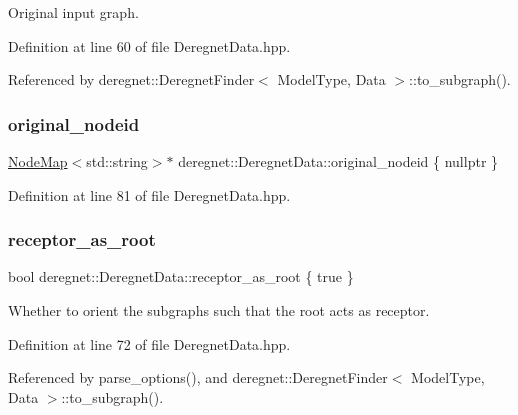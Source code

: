 Original input graph. 



Definition at line 60 of file Deregnet\+Data.\+hpp.



Referenced by deregnet\+::\+Deregnet\+Finder$<$ Model\+Type, Data $>$\+::to\+\_\+subgraph().

\mbox{\label{classderegnet_1_1DeregnetData_a6707f9bbc1ac5ccf78724e73cd8053b1}} 
\subsubsection{\texorpdfstring{original\+\_\+nodeid}{original\_nodeid}}
{\footnotesize\ttfamily \hyperlink{namespacederegnet_ae102b707ae1d6f83c639ece5e0dd5658}{Node\+Map}$<$std\+::string$>$$\ast$ deregnet\+::\+Deregnet\+Data\+::original\+\_\+nodeid \{ nullptr \}\hspace{0.3cm}{\ttfamily [private]}}



Definition at line 81 of file Deregnet\+Data.\+hpp.

\mbox{\label{classderegnet_1_1DeregnetData_ae7936fe59661a68464134b9251303727}} 
\subsubsection{\texorpdfstring{receptor\+\_\+as\+\_\+root}{receptor\_as\_root}}
{\footnotesize\ttfamily bool deregnet\+::\+Deregnet\+Data\+::receptor\+\_\+as\+\_\+root \{ true \}}



Whether to orient the subgraphs such that the root acts as \textquotesingle{}receptor\textquotesingle{}. 



Definition at line 72 of file Deregnet\+Data.\+hpp.



Referenced by parse\+\_\+options(), and deregnet\+::\+Deregnet\+Finder$<$ Model\+Type, Data $>$\+::to\+\_\+subgraph().

